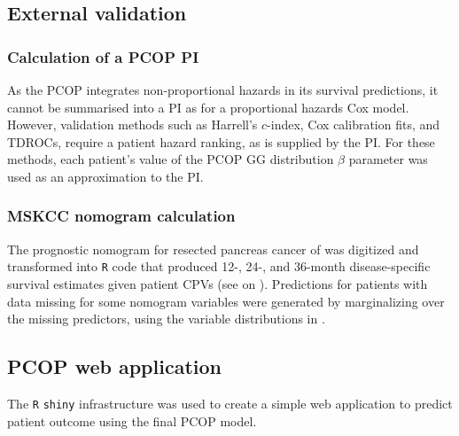\documentclass[dissertation.tex]{subfiles}
\begin{document}
\subsection{External validation}
\subsubsection{Calculation of a \acrshort{PCOP} \acrlong{PI}}
As the \gls{PCOP} integrates non-proportional hazards in its survival predictions, it cannot be summarised into a \gls{PI} as for a proportional hazards Cox model.  However, validation methods such as Harrell's $c$-index, Cox calibration fits, and \glspl{TDROC}, require a patient hazard ranking, as is supplied by the \gls{PI}.  For these methods, each patient's value of the \gls{PCOP} \gls{GG} distribution $\beta$ parameter was used as an approximation to the \gls{PI}.

\subsubsection{MSKCC nomogram calculation}
The prognostic nomogram for resected pancreas cancer of \cite{Brennan2004} was digitized and transformed into \texttt{R} code that produced 12-, 24-, and 36-month disease-specific survival estimates given patient \glspl{CPV} (see  on ).  Predictions for patients with data missing for some nomogram variables were generated by marginalizing over the missing predictors, using the variable distributions in \cite{Brennan2004}.

\subsection{PCOP web application}
The \texttt{R} \texttt{shiny} infrastructure was used to create a simple web application to predict patient outcome using the final \gls{PCOP} model.
\end{document}
